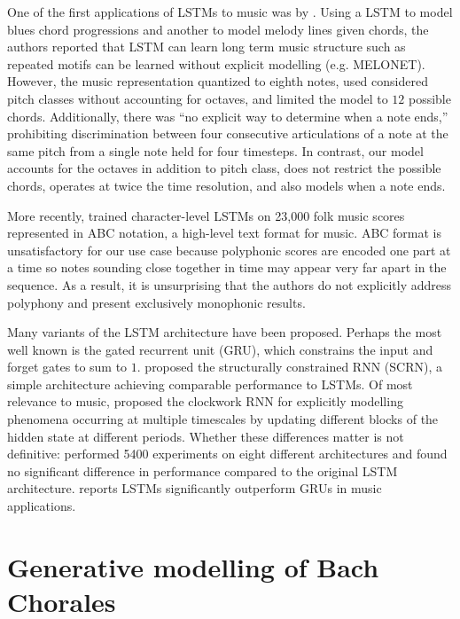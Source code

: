 One of the first applications of LSTMs to music was by
\citet{Eck2002,Eck2002-blues}. Using a LSTM to model blues chord progressions
and another to model melody lines given chords, the authors reported that LSTM
can learn long term music structure such as repeated motifs can be learned
without explicit modelling (e.g. MELONET). However, the music representation
quantized to eighth notes, used considered pitch classes without accounting for
octaves, and limited the model to $12$ possible chords. Additionally, there was
``no explicit way to determine when a note ends,'' prohibiting discrimination
between four consecutive articulations of a note at the same pitch from a
single note held for four timesteps. In contrast, our model accounts for the
octaves in addition to pitch class, does not restrict the possible chords,
operates at twice the time resolution, and also models when a note ends.

More recently, \citet{sturm2015folk,sturm2016music} trained
character-level LSTMs on 23,000 folk music scores represented in ABC
notation\citep{abcstandard}, a high-level text format for music. ABC format is
unsatisfactory for our use case because polyphonic scores are encoded one part
at a time so notes sounding close together in time may appear very far apart in
the sequence. As a result, it is unsurprising that the authors do not
explicitly address polyphony and present exclusively monophonic results.

Many variants of the LSTM architecture have been proposed. Perhaps the most
well known is the gated recurrent unit (GRU)\citep{cho2014learning}, which
constrains the input and forget gates to sum to $1$. \citet{Mikolov2015}
proposed the structurally constrained RNN (SCRN), a simple architecture
achieving comparable performance to LSTMs. Of most relevance to music,
\citet{Koutnik2014} proposed the clockwork RNN for explicitly modelling phenomena
occurring at multiple timescales by updating different blocks of the hidden
state at different periods. Whether these differences matter is not definitive:
\citet{greff2015lstm} performed 5400 experiments on eight different
architectures and found no significant difference in performance compared to
the original LSTM architecture. \citet{Nayebi2015} reports LSTMs significantly
outperform GRUs in music applications.

\section{Generative modelling of Bach Chorales}

